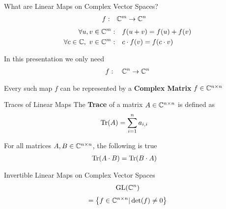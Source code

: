 \begin{frame}{What are Linear Maps on Complex Vector Spaces?}
    \Large
    \begin{align*}
        f: \quad & \mathbb{C}^m \to \mathbb{C}^n
    \end{align*}
    \large
    \pause
    \begin{align*}
        \forall u, v \in \mathbb{C}^m: \quad & f(u + v) = f(u) + f(v) \\
        \forall c \in \mathbb{C},\ v \in \mathbb{C}^m: \quad & c \cdot f(v) = f(c \cdot v)
    \end{align*}
    
    \pause
    In this presentation we only need
    \Large
    \begin{align*}
        f: \quad \mathbb{C}^n \to \mathbb{C}^n
    \end{align*}

    \large
    \pause
    Every such map $f$ can be represented by a \textbf{Complex Matrix} $f \in \mathbb{C}^{n \times n}$
    \vspace{2em}
\end{frame}

\begin{frame}{Traces of Linear Maps}
    The \textbf{Trace} of a matrix $A \in \mathbb{C}^{n \times n}$ is defined as
    \begin{align*}
        \operatorname{Tr}(A) & = \sum_{i = 1}^n a_{i, i}
    \end{align*}
    
    \pause
    For all matrices $A, B \in \mathbb{C}^{n \times n}$, the following is true
    \begin{align*}
        \operatorname{Tr}(A \cdot B) & = \operatorname{Tr}(B \cdot A)
    \end{align*}
\end{frame}

\begin{frame}{Invertible Linear Maps on Complex Vector Spaces}
    \huge
    \begin{align*}
        \operatorname{GL}(\mathbb{C}^n)
    \end{align*}
    \large
    \begin{align*}
        = \left\{
            f \in \mathbb{C}^{n \times n} | \det(f) \neq 0
        \right\}
    \end{align*}

\end{frame}
